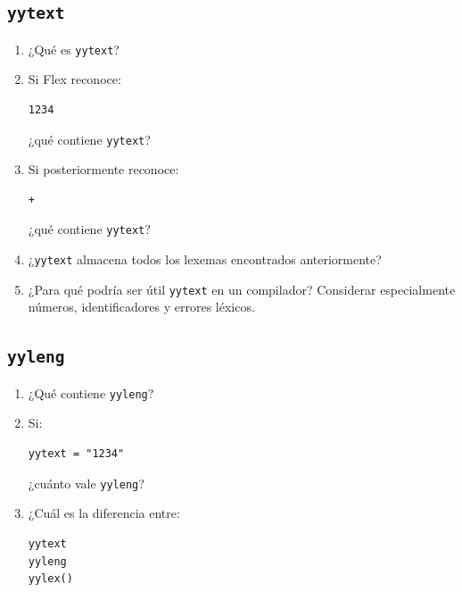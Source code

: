 \documentclass{article}
\begin{document}
\subsection{\texttt{yytext}}

\begin{enumerate}
    \item ¿Qué es \texttt{yytext}?

    \item Si Flex reconoce:

\begin{verbatim}
1234
\end{verbatim}

    ¿qué contiene \texttt{yytext}?

    \item Si posteriormente reconoce:

\begin{verbatim}
+
\end{verbatim}

    ¿qué contiene \texttt{yytext}?

    \item ¿\texttt{yytext} almacena todos los lexemas encontrados
    anteriormente?

    \item ¿Para qué podría ser útil \texttt{yytext} en un compilador?
    Considerar especialmente números, identificadores y errores léxicos.
\end{enumerate}

\subsection{\texttt{yyleng}}

\begin{enumerate}
    \item ¿Qué contiene \texttt{yyleng}?

    \item Si:

\begin{verbatim}
yytext = "1234"
\end{verbatim}

    ¿cuánto vale \texttt{yyleng}?

    \item ¿Cuál es la diferencia entre:

\begin{verbatim}
yytext
yyleng
yylex()
\end{verbatim}
\end{enumerate}
\end{document}

